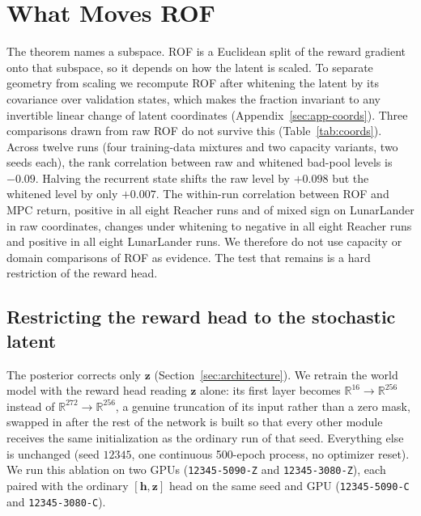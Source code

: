 \documentclass[11pt]{article}
\theoremstyle{remark}
\begin{document}
\section{What Moves ROF}
\label{sec:validity}

The theorem names a subspace. ROF is a Euclidean split of the reward gradient onto that subspace, so it depends on how the latent is scaled. To separate geometry from scaling we recompute ROF after whitening the latent by its covariance over validation states, which makes the fraction invariant to any invertible linear change of latent coordinates (Appendix~\ref{sec:app-coords}). Three comparisons drawn from raw ROF do not survive this (Table~\ref{tab:coords}). Across twelve runs (four training-data mixtures and two capacity variants, two seeds each), the rank correlation between raw and whitened bad-pool levels is $-0.09$. Halving the recurrent state shifts the raw level by $+0.098$ but the whitened level by only $+0.007$. The within-run correlation between ROF and MPC return, positive in all eight Reacher runs and of mixed sign on LunarLander in raw coordinates, changes under whitening to negative in all eight Reacher runs and positive in all eight LunarLander runs. We therefore do not use capacity or domain comparisons of ROF as evidence. The test that remains is a hard restriction of the reward head.

\subsection{Restricting the reward head to the stochastic latent}
\label{sec:zonly}

The posterior corrects only $\bm{z}$ (Section~\ref{sec:architecture}). We retrain the world model with the reward head reading $\bm{z}$ alone: its first layer becomes $\mathbb{R}^{16}{\to}\mathbb{R}^{256}$ instead of $\mathbb{R}^{272}{\to}\mathbb{R}^{256}$, a genuine truncation of its input rather than a zero mask, swapped in after the rest of the network is built so that every other module receives the same initialization as the ordinary run of that seed. Everything else is unchanged (seed $12345$, one continuous 500-epoch process, no optimizer reset). We run this ablation on two GPUs (\texttt{12345-5090-Z} and \texttt{12345-3080-Z}), each paired with the ordinary $[\bm{h},\bm{z}]$ head on the same seed and GPU (\texttt{12345-5090-C} and \texttt{12345-3080-C}).
\end{document}
